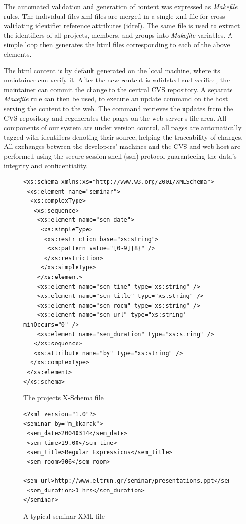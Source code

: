 \documentclass[10pt]{article}
\begin{document}
The automated validation and generation of content was
expressed as {\em Makefile} rules.
The individual files {\sc xml} files are merged in a
single {\sc xml} file for cross validating identifier
reference attributes ({\sc idref}).
The same file is used to extract the identifiers of
all projects, members, and groups into {\em Makefile}
variables.
A simple loop then generates the {\sc html} files
corresponding to each of the above elements.

The {\sc html} content is by default generated on the
local machine, where its maintainer can verify it.
After the new content is validated and verified,
the maintainer can commit the change to the central {\sc CVS} repository. 
A separate {\em Makefile} rule can then be used,
to execute an update command on the
host serving the content to the web.
The command retrieves the updates from the {\sc CVS}
repository and regenerates the pages on the web-server's
file area.
All components of our system are under version control,
all pages are automatically tagged with identifiers
denoting their source, helping the traceability of changes.
All exchanges between the developers' machines and the
{\sc CVS} and web host are performed using the secure session
shell ({\sc ssh}) protocol guaranteeing the data's integrity
and confidentiality.

\begin{figure}[h!]
\lstset{language=MYLANG,basicstyle=\ttfamily}
{\begin{lstlisting}
<xs:schema xmlns:xs="http://www.w3.org/2001/XMLSchema">
 <xs:element name="seminar">
  <xs:complexType>
   <xs:sequence>
    <xs:element name="sem_date">
     <xs:simpleType>
      <xs:restriction base="xs:string">
       <xs:pattern value="[0-9]{8}" />
      </xs:restriction>
     </xs:simpleType>
    </xs:element>
    <xs:element name="sem_time" type="xs:string" />
    <xs:element name="sem_title" type="xs:string" />
    <xs:element name="sem_room" type="xs:string" />
    <xs:element name="sem_url" type="xs:string" minOccurs="0" />
    <xs:element name="sem_duration" type="xs:string" />
   </xs:sequence>
   <xs:attribute name="by" type="xs:string" />
  </xs:complexType>
 </xs:element>
</xs:schema>
\end{lstlisting}}
\caption{The projects X-Schema file}
\label{fig:project-dtd}
\end{figure}

\begin{figure}[h!]
\lstset{language=MYLANG,basicstyle=\ttfamily}
{\begin{lstlisting}
<?xml version="1.0"?>
<seminar by="m_bkarak">
 <sem_date>20040314</sem_date>
 <sem_time>19:00</sem_time>
 <sem_title>Regular Expressions</sem_title>
 <sem_room>906</sem_room>
 <sem_url>http://www.eltrun.gr/seminar/presentations.ppt</sem_url>
 <sem_duration>3 hrs</sem_duration>
</seminar>
\end{lstlisting}}
\caption{A typical seminar XML file}
\label{fig:project-xml}
\end{figure}
\end{document}
